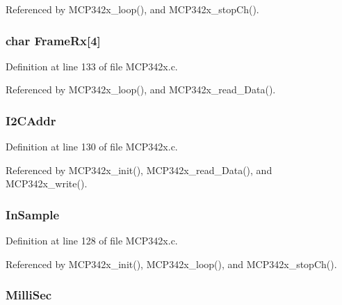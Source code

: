 Referenced by M\-C\-P342x\-\_\-loop(), and M\-C\-P342x\-\_\-stop\-Ch().

\hypertarget{structtag_m_c_p342x_a1f30f05b6ad09b1daa7195f6ec245656}{
\subsubsection[{Frame\-Rx}]{\setlength{\rightskip}{0pt plus 5cm}char Frame\-Rx\mbox{[}4\mbox{]}}}\label{structtag_m_c_p342x_a1f30f05b6ad09b1daa7195f6ec245656}


Definition at line 133 of file M\-C\-P342x.\-c.



Referenced by M\-C\-P342x\-\_\-loop(), and M\-C\-P342x\-\_\-read\-\_\-\-Data().

\hypertarget{structtag_m_c_p342x_a525e929bfd993f97bf03022b3d01e334}{
\subsubsection[{I2\-C\-Addr}]{ I2\-C\-Addr}}\label{structtag_m_c_p342x_a525e929bfd993f97bf03022b3d01e334}


Definition at line 130 of file M\-C\-P342x.\-c.



Referenced by M\-C\-P342x\-\_\-init(), M\-C\-P342x\-\_\-read\-\_\-\-Data(), and M\-C\-P342x\-\_\-write().

\hypertarget{structtag_m_c_p342x_a134d70693df6521dd8d693f79a14737e}{
\subsubsection[{In\-Sample}]{ In\-Sample}}\label{structtag_m_c_p342x_a134d70693df6521dd8d693f79a14737e}


Definition at line 128 of file M\-C\-P342x.\-c.



Referenced by M\-C\-P342x\-\_\-init(), M\-C\-P342x\-\_\-loop(), and M\-C\-P342x\-\_\-stop\-Ch().

\hypertarget{structtag_m_c_p342x_a8421761e0e1b887991b4192078254bcf}{
\subsubsection[{Milli\-Sec}]{ Milli\-Sec}}\label{structtag_m_c_p342x_a8421761e0e1b887991b4192078254bcf}


